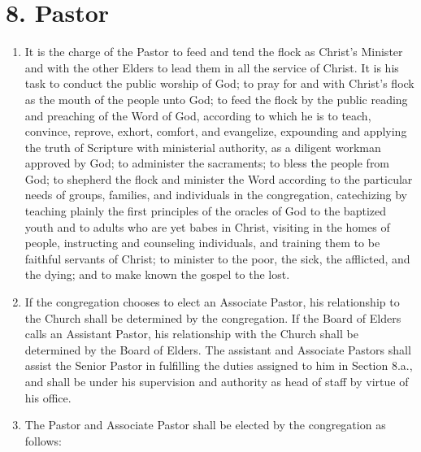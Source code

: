 \documentclass[
]{book}
\begin{document}
\hypertarget{pastor}{%
\section*{8. Pastor}\label{pastor}}

\begin{enumerate}
\def\labelenumi{\alph{enumi}.}
\item
  It is the charge of the Pastor to feed and tend the flock as Christ's Minister and with the other Elders to lead them in all the service of Christ. It is his task to conduct the public worship of God; to pray for and with Christ's flock as the mouth of the people unto God; to feed the flock by the public reading and preaching of the Word of God, according to which he is to teach, convince, reprove, exhort, comfort, and evangelize, expounding and applying the truth of Scripture with ministerial authority, as a diligent workman approved by God; to administer the sacraments; to bless the people from God; to shepherd the flock and minister the Word according to the particular needs of groups, families, and individuals in the congregation, catechizing by teaching plainly the first principles of the oracles of God to the baptized youth and to adults who are yet babes in Christ, visiting in the homes of people, instructing and counseling individuals, and training them to be faithful servants of Christ; to minister to the poor, the sick, the afflicted, and the dying; and to make known the gospel to the lost.
\item
  If the congregation chooses to elect an Associate Pastor, his relationship to the Church shall be determined by the congregation. If the Board of Elders calls an Assistant Pastor, his relationship with the Church shall be determined by the Board of Elders. The assistant and Associate Pastors shall assist the Senior Pastor in fulfilling the duties assigned to him in Section 8.a., and shall be under his supervision and authority as head of staff by virtue of his office.
\item
  The Pastor and Associate Pastor shall be elected by the congregation as follows:


\end{enumerate}
\end{document}
